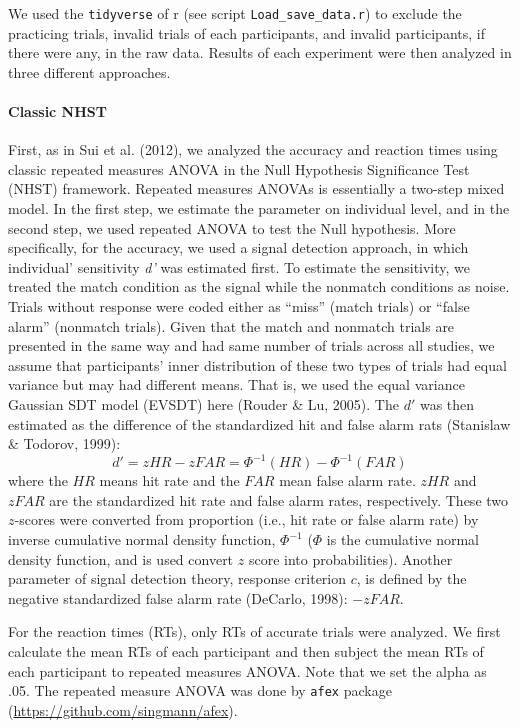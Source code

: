\documentclass[
  english,
  man]{apa6}
\let\oldparagraph\paragraph
\renewcommand{\paragraph}[1]{\oldparagraph{#1}\mbox{}}
\begin{document}
We used the \texttt{tidyverse} of r (see script \texttt{Load\_save\_data.r}) to exclude the practicing trials, invalid trials of each participants, and invalid participants, if there were any, in the raw data. Results of each experiment were then analyzed in three different approaches.

\hypertarget{classic-nhst}{%
\paragraph{Classic NHST}\label{classic-nhst}}

First, as in Sui et al. (2012), we analyzed the accuracy and reaction times using classic repeated measures ANOVA in the Null Hypothesis Significance Test (NHST) framework. Repeated measures ANOVAs is essentially a two-step mixed model. In the first step, we estimate the parameter on individual level, and in the second step, we used repeated ANOVA to test the Null hypothesis. More specifically, for the accuracy, we used a signal detection approach, in which individual' sensitivity \emph{d'} was estimated first. To estimate the sensitivity, we treated the match condition as the signal while the nonmatch conditions as noise. Trials without response were coded either as \enquote{miss} (match trials) or \enquote{false alarm} (nonmatch trials). Given that the match and nonmatch trials are presented in the same way and had same number of trials across all studies, we assume that participants' inner distribution of these two types of trials had equal variance but may had different means. That is, we used the equal variance Gaussian SDT model (EVSDT) here (Rouder \& Lu, 2005). The \(d'\) was then estimated as the difference of the standardized hit and false alarm rats (Stanislaw \& Todorov, 1999):
\[ d' = zHR - zFAR = \Phi^{-1}(HR) - \Phi^{-1}(FAR) \]
where the \(HR\) means hit rate and the \(FAR\) mean false alarm rate. \(zHR\) and \(zFAR\) are the standardized hit rate and false alarm rates, respectively. These two \(z\)-scores were converted from proportion (i.e., hit rate or false alarm rate) by inverse cumulative normal density function, \(\Phi^{-1}\) (\(\Phi\) is the cumulative normal density function, and is used convert \(z\) score into probabilities). Another parameter of signal detection theory, response criterion \(c\), is defined by the negative standardized false alarm rate (DeCarlo, 1998): \(-zFAR\).

For the reaction times (RTs), only RTs of accurate trials were analyzed. We first calculate the mean RTs of each participant and then subject the mean RTs of each participant to repeated measures ANOVA. Note that we set the alpha as .05. The repeated measure ANOVA was done by \texttt{afex} package (\url{https://github.com/singmann/afex}).
\end{document}
